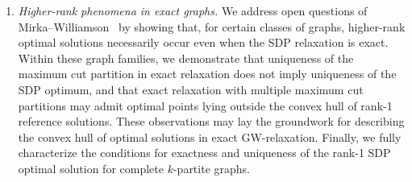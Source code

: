 \documentclass[a4paper,fleqn]{cas-sc}
\newcommand{\1}{\mathbf{1}}
\begin{document}
\begin{enumerate}
\item \textit{Higher-rank phenomena in exact graphs.} We address open questions of Mirka--Williamson~\citep{mirka2024max} by showing that, for certain classes of graphs, higher-rank optimal solutions necessarily occur even when the SDP relaxation is exact. Within these graph families, we demonstrate that uniqueness of the maximum cut partition in exact relaxation does not imply uniqueness of the SDP optimum, and that exact relaxation with multiple maximum cut partitions may admit optimal points lying outside the convex hull of rank-1 reference solutions. These observations may lay the groundwork for describing the convex hull of optimal solutions in exact GW-relaxation. Finally, we fully characterize the conditions for exactness and uniqueness of the rank-1 SDP optimal solution for complete $k$-partite graphs.
\end{enumerate}
\end{document}
